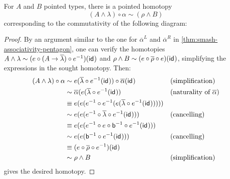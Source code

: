 \documentclass{article}
\newcommand{\smsh}{\wedge}
\renewcommand{\o}{\ensuremath{\circ}}
\newcommand{\sy}{^{-1}}
\newcommand{\alphabar}{\overline{\alpha}}
\newcommand{\rhobar}{\overline{\rho}}
\newcommand{\lambdabar}{\overline{\lambda}}
\newcommand{\two}{\mathsf{b}}
\begin{document}
\begin{thm}\label{thm:smash-unitors-triangle}
	For $A$ and $B$ pointed types, there is a pointed homotopy
	\[(A \smsh \lambda) \o \alpha \sim (\rho \smsh B)\]
	corresponding to the commutativity of the following diagram:
	\begin{center}
	\end{center}
\end{thm}
\begin{proof}
	By an argument similar to the one for $\alphabar^L$ and $\alphabar^R$ in \autoref{thm:smash-associativity-pentagon}, one can verify the homotopies $A \smsh \lambda \sim (e \o (A \to \lambdabar) \o e\sy)(\idfunc)$ and $\rho \smsh B \sim (e \o \rhobar \o e)(\idfunc)$, simplifying the expressions in the sought homotopy. Then:
	\begin{align*}
		(A \smsh \lambda) \o \alpha
		&\sim e(\lambdabar \o e\sy(\idfunc)) \o \alphabar(\idfunc) &&\text{(simplification)}\\
		&\sim \alphabar(e(\lambdabar \o e\sy(\idfunc)) &&\text{(naturality of $\alphabar$)}\\
		&\judgeq e(e(e\sy \o e\sy (e(\lambdabar \o e\sy(\idfunc)))))\\
		&\sim e(e(e\sy \o \lambdabar \o e\sy(\idfunc))) &&\text{(cancelling)}\\
		&\judgeq e(e(e\sy \o e \o \two\sy \o e\sy(\idfunc)))\\
		&\sim e(e(\two\sy \o e\sy(\idfunc))) &&\text{(cancelling)}\\
		&\judgeq (e \o \rhobar \o e\sy)(\idfunc)\\
		&\sim \rho \smsh B &&\text{(simplification)}
	\end{align*}
	gives the desired homotopy.
\end{proof}
\end{document}
